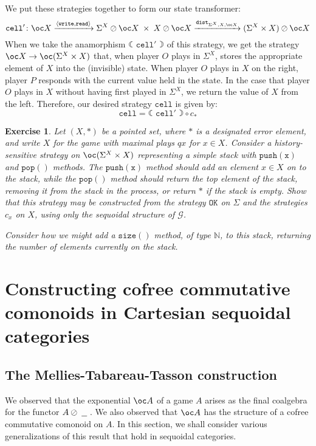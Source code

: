 \documentclass[a4paper,UKenglish]{lipics-v2016}
\theoremstyle{plain}
\newtheorem{exercise}{Exercise}
\theoremstyle{definition}
\newcommand*\from{\colon}
\newcommand{\sequoid}{\oslash}
\newcommand{\comp}[2]{#1 \circ #2}
\newcommand{\G}{\mathcal G}
\newcommand{\blank}{\;\underline{\hspace{1.5ex}}\;}
\newcommand{\fcoal}[1]{{\leftmoon #1 \rightmoon}}
\newcommand{\dist}{{\mathtt{dist}}}
\newcommand{\bN}{{\mathbb{N}}}
\newcommand{\OK}{{\mathtt{OK}}}
\newcommand{\cell}{{\mathtt{cell}}}
\renewcommand{\read}{{\mathtt{read}}}
\newcommand{\wwrite}{{\mathtt{write}}}
\newlength{\arrow}
\begin{document}
We put these strategies together to form our state transformer:
\[
  \cell'\from \oc X \xrightarrow{\langle\wwrite,\read\rangle} \Sigma^X\sequoid\oc X \;\times\;X\sequoid\oc X \xrightarrow{\dist_{\Sigma^X,X,\oc X}} (\Sigma^X\times X)\sequoid \oc X
  \]
When we take the anamorphism $\fcoal{\cell'}$ of this strategy, we get the strategy $\oc X \to \oc (\Sigma^X\times X)$ that, when player $O$ plays in $\Sigma^X$, stores the appropriate element of $X$ into the (invisible) state.  When player $O$ plays in $X$ on the right, player $P$ responds with the current value held in the state.  In the case that player $O$ plays in $X$ without having first played in $\Sigma^X$, we return the value of $X$ from the left.  Therefore, our desired strategy $\cell$ is given by:
\[
  \cell = \comp{\fcoal{\cell'}}{c_*}
  \]

\begin{exercise}
  Let $(X,*)$ be a pointed set, where $*$ is a designated error element, and write $X$ for the game with maximal plays $qx$ for $x\in X$.  Consider a history-sensitive strategy on $\oc(\Sigma^X\times X)$ representing a simple stack with $\mathtt{push(x)}$ and $\mathtt{pop()}$ methods.  The $\mathtt{push(x)}$ method should add an element $x\in X$ on to the stack, while the $\mathtt{pop()}$ method should return the top element of the stack, removing it from the stack in the process, or return $*$ if the stack is empty.  Show that this strategy may be constructed from the strategy $\OK$ on $\Sigma$ and the strategies $c_x$ on $X$, using only the sequoidal structure of $\G$.  

  Consider how we might add a $\mathtt{size()}$ method, of type $\bN$, to this stack, returning the number of elements currently on the stack.
\end{exercise}

\section{Constructing cofree commutative comonoids in Cartesian sequoidal categories}

\subsection{The Mellies-Tabareau-Tasson construction}

We observed that the exponential $\oc A$ of a game $A$ arises as the final coalgebra for the functor $A\sequoid\blank$.  We also observed that $\oc A$ has the structure of a cofree commutative comonoid on $A$.  In this section, we shall consider various generalizations of this result that hold in sequoidal categories.  
\end{document}
